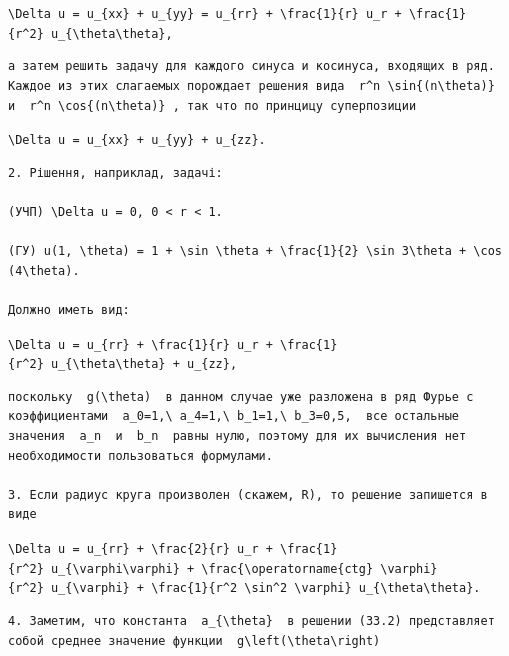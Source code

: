 \documentclass[
  ukrainian,
]{article}
\begin{document}
\texttt{\textbackslash{}Delta\ u\ =\ u\_\{xx\}\ +\ u\_\{yy\}\ =\ u\_\{rr\}\ +\ \textbackslash{}frac\{1\}\{r\}\ u\_r\ +\ \textbackslash{}frac\{1\}\{r\^{}2\}\ u\_\{\textbackslash{}theta\textbackslash{}theta\},}

\begin{verbatim}
а затем решить задачу для каждого синуса и косинуса, входящих в ряд. Каждое из этих слагаемых порождает решения вида  r^n \sin{(n\theta)}  и  r^n \cos{(n\theta)} , так что по принцицу суперпозиции
\end{verbatim}

\texttt{\textbackslash{}Delta\ u\ =\ u\_\{xx\}\ +\ u\_\{yy\}\ +\ u\_\{zz\}.}

\begin{verbatim}
2. Рішення, наприклад, задачі:

(УЧП) \Delta u = 0, 0 < r < 1.

(ГУ) u(1, \theta) = 1 + \sin \theta + \frac{1}{2} \sin 3\theta + \cos (4\theta).

Должно иметь вид:
\end{verbatim}

\texttt{\textbackslash{}Delta\ u\ =\ u\_\{rr\}\ +\ \textbackslash{}frac\{1\}\{r\}\ u\_r\ +\ \textbackslash{}frac\{1\}\{r\^{}2\}\ u\_\{\textbackslash{}theta\textbackslash{}theta\}\ +\ u\_\{zz\},}

\begin{verbatim}
поскольку  g(\theta)  в данном случае уже разложена в ряд Фурье с коэффициентами  a_0=1,\ a_4=1,\ b_1=1,\ b_3=0,5,  все остальные значения  a_n  и  b_n  равны нулю, поэтому для их вычисления нет необходимости пользоваться формулами.

3. Если радиус круга произволен (скажем, R), то решение запишется в виде
\end{verbatim}

\texttt{\textbackslash{}Delta\ u\ =\ u\_\{rr\}\ +\ \textbackslash{}frac\{2\}\{r\}\ u\_r\ +\ \textbackslash{}frac\{1\}\{r\^{}2\}\ u\_\{\textbackslash{}varphi\textbackslash{}varphi\}\ +\ \textbackslash{}frac\{\textbackslash{}operatorname\{ctg\}\ \textbackslash{}varphi\}\{r\^{}2\}\ u\_\{\textbackslash{}varphi\}\ +\ \textbackslash{}frac\{1\}\{r\^{}2\ \textbackslash{}sin\^{}2\ \textbackslash{}varphi\}\ u\_\{\textbackslash{}theta\textbackslash{}theta\}.}

\begin{verbatim}
4. Заметим, что константа  a_{\theta}  в решении (33.2) представляет собой среднее значение функции  g\left(\theta\right)
\end{verbatim}
\end{document}
